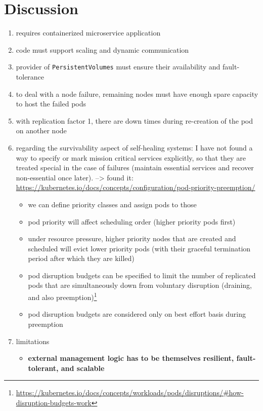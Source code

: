 \section{Discussion}
  \begin{enumerate}
    \item requires containerized microservice application
    \item code must support scaling and dynamic communication
    \item provider of \texttt{PersistentVolumes} must ensure their availability and fault-tolerance
    \item to deal with a node failure, remaining nodes must have enough spare capacity to host the failed pods
    \item with replication factor 1, there are down times during re-creation of the pod on another node
    \item regarding the survivability aspect of self-healing systems: I have not found a way to specify or mark mission critical services explicitly, so that they are treated special in the case of failures (maintain essential services and recover non-essential once later).
    --> found it: \url{https://kubernetes.io/docs/concepts/configuration/pod-priority-preemption/}
      \begin{itemize}
        \item we can define priority classes and assign pods to those
        \item pod priority will affect scheduling order (higher priority pods first)
        \item under resource pressure, higher priority nodes that are created and scheduled will evict lower priority pods (with their graceful termination period after which they are killed)
        \item pod disruption budgets can be specified to limit the number of replicated pods that are simultaneously down from voluntary disruption (draining, and also preemption)\footnote{\url{https://kubernetes.io/docs/concepts/workloads/pods/disruptions/\#how-disruption-budgets-work}}
        \item pod disruption budgets are considered only on best effort basis during preemption
      \end{itemize}
    \item limitations
      \begin{itemize}
        \item \textbf{external management logic has to be themselves resilient, fault-tolerant, and scalable}

\end{itemize}
\end{enumerate}
